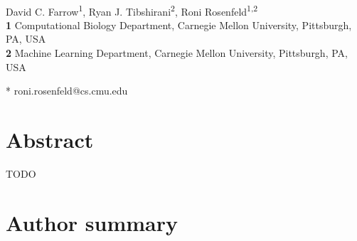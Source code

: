 \documentclass[10pt,letterpaper]{article}
\begin{document}
\vspace*{0.2in}

\begin{flushleft}
{\Large
\textbf{} %
}
\newline
\\
David C. Farrow\textsuperscript{1},
Ryan J. Tibshirani\textsuperscript{2},
Roni Rosenfeld\textsuperscript{1,2}
\\
\bigskip
\textbf{1} Computational Biology Department, Carnegie Mellon University, Pittsburgh, PA, USA
\\
\textbf{2} Machine Learning Department, Carnegie Mellon University, Pittsburgh, PA, USA
\\
\bigskip

* roni.rosenfeld@cs.cmu.edu

\end{flushleft}
\section*{Abstract}

TODO

\section*{Author summary}
\end{document}
